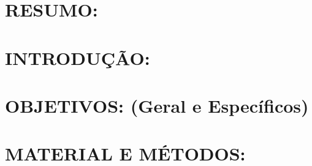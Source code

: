 \documentclass{article}
\begin{document}


\section{RESUMO:} \label{sec:resumo}

\section{INTRODUÇÃO:} \label{sec:introdução}

\section{OBJETIVOS: (Geral e Específicos)} \label{sec:objetivos}

\section{MATERIAL E MÉTODOS:} \label{sec:material_metodos}
\end{document}
